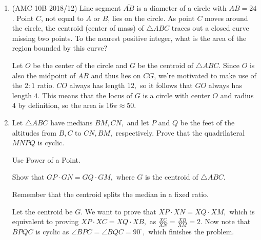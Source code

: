 \begin{enumerate}
	\item (AMC 10B 2018/12) Line segment $\overline{AB}$ is a diameter of a circle with $AB=24$. Point $C$, not equal to $A$ or $B$, lies on the circle. As point $C$ moves around the circle, the centroid (center of mass) of $\triangle{ABC}$ traces out a closed curve missing two points. To the nearest positive integer, what is the area of the region bounded by this curve?
\begin{solu}
\begin{addsol}
{Let $O$ be the center of the circle and $G$ be the centroid of $\triangle ABC.$ Since $O$ is also the midpoint of $AB$ and thus lies on $CG$, we're motivated to make use of the $2:1$ ratio. $CO$ always has length $12,$ so it follows that $GO$ always has length $4.$ This means that the locus of $G$ is a circle with center $O$ and radius $4$ by definition, so the area is $16\pi\approx 50.$

\begin{center}
\end{center}}
\end{addsol}
\end{solu}

	\item Let $\triangle ABC$ have medians $BM,CN,$ and let $P$ and $Q$ be the feet of the altitudes from $B,C$ to $CN,BM,$ respectively. Prove that the quadrilateral $MNPQ$ is cyclic.
	\begin{hint}
	\begin{addhint}
	{Use Power of a Point.}
	\end{addhint}
	\begin{addhint}
	{Show that $GP\cdot GN=GQ\cdot GM,$ where $G$ is the centroid of $\triangle ABC.$}
	\end{addhint}
	\begin{addhint}
	{Remember that the centroid splits the median in a fixed ratio.}
	\end{addhint}
	\end{hint}
	\begin{solu}
	\begin{addsol}
	{Let the centroid be $G.$ We want to prove that $XP\cdot XN=XQ\cdot XM,$ which is equivalent to proving $XP\cdot XC=XQ\cdot XB,$ as $\frac{XC}{XN}=\frac{XB}{XM}=2.$ Now note that $BPQC$ is cyclic as $\angle BPC=\angle BQC=90^{\circ},$ which finishes the problem.}
	\end{addsol}
	\end{solu}


\end{enumerate}
